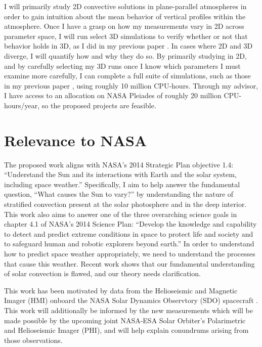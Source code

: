 \documentclass[aasms,12pt]{article}
\begin{document}
I will primarily study 2D convective solutions in plane-parallel atmospheres in order to gain
intuition about the mean behavior of vertical profiles within the atmosphere.  Once I have a grasp
on how my measurements vary in 2D across parameter space, I will run select 3D simulations to
verify whether or not that behavior holds in 3D, as I did in my previous paper \citep{anders&brown2017}.
In cases where 2D and 3D diverge, I will quantify how and why they do so.
By primarily studying in 2D, and by carefully
selecting my 3D runs once I know which parameters I must examine more carefully, I can complete
a full suite of simulations, such as those in my previous paper \citep{anders&brown2017}, using
roughly 10 million CPU-hours.  Through my advisor, I have access to an allocation on NASA Pleiades
of roughly 20 million CPU-hours/year, so the proposed projects are feasible.




\section{Relevance to NASA} 
The proposed work aligns with NASA's 2014 Strategic Plan objective
1.4:
``Understand the Sun and its interactions with Earth and the solar
system, including space weather.''  Specifically, I aim to help answer
the fundamental question, ``What causes the Sun to vary?'' by understanding
the nature of stratified convection present at the solar photosphere and in the deep interior.
This work also aims to answer one of the three overarching science goals
in chapter 4.1 of NASA's 2014 Science Plan: 
``Develop the
knowledge and capability to detect and predict extreme conditions in space to
protect life and society and to safeguard human and robotic explorers beyond
earth.'' In order to understand how to predict space weather appropriately, we
need to understand the processes that cause this weather.  Recent work
shows that our fundamental understanding of solar convection is flawed, and our theory needs
clarification.

This work has been motivated by data from the Helioseismic and Magnetic Imager (HMI) onboard
the NASA Solar Dynamics Observtory (SDO) spacecraft 
\citep{hanasoge&all2012, greer&all2015, hathaway&all2015}. This work will additionally be informed
by the new measurements which will
be made possible by the upcoming joint NASA-ESA Solar Orbiter's Polarimetric and 
Helioseismic Imager (PHI), and will help explain conundrums arising from those observations.
\end{document}
